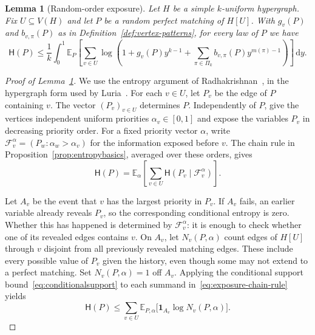 \documentclass[11pt,reqno]{amsart}
\numberwithin{equation}{section}
\theoremstyle{plain}
\newtheorem{lemma}[theorem]{Lemma}
\theoremstyle{definition}
\newcommand{\E}{\mathbb E}
\newcommand{\HH}{\mathsf H}
\newcommand{\dd}{\,\mathrm d}
\begin{document}
\begin{lemma}[Random-order exposure]\label{lem:random-order-entropy}
    Let $H$ be a simple $k$-uniform hypergraph. Fix $U\subseteq V(H)$ and let $P$ be a random perfect matching of $H[U]$.
    With $g_v(P)$ and $b_{v,\pi}(P)$ as in Definition~\ref{def:vertex-patterns}, for every law of $P$ we have
    \[
        \HH(P)\le\frac1k\int_0^1\E_P\left[\sum_{v\in U}
        \log\left(1+g_v(P)y^{k-1}+\sum_{\pi\in\Pi_k}b_{v,\pi}(P)y^{m(\pi)-1}\right)\right]\dd y.
    \]
\end{lemma}
\begin{proof}[Proof of Lemma~\ref{lem:random-order-entropy}]
    We use the entropy argument of Radhakrishnan~\cite{Radhakrishnan}, in the hypergraph form used by Luria~\cite[proof of Theorem~3.1]{Luria}.
    For each $v\in U$, let $P_v$ be the edge of $P$ containing $v$.
    The vector $(P_v)_{v\in U}$ determines $P$.
    Independently of $P$, give the vertices independent uniform priorities $\alpha_v\in[0,1]$ and expose the variables $P_v$ in decreasing priority order.
    For a fixed priority vector $\alpha$, write $\mathcal F_v^\alpha=(P_w:\alpha_w>\alpha_v)$ for the information exposed before $v$.
    The chain rule in Proposition~\ref{prop:entropybasics}, averaged over these orders, gives
    \begin{equation}\label{eq:exposure-chain-rule}
        \HH(P)=\E_\alpha\left[\sum_{v\in U}\HH(P_v\mid\mathcal F_v^\alpha)\right].
    \end{equation}

    Let $A_v$ be the event that $v$ has the largest priority in $P_v$.
    If $A_v$ fails, an earlier variable already reveals $P_v$, so the corresponding conditional entropy is zero.
    Whether this has happened is determined by $\mathcal F_v^\alpha$: it is enough to check whether one of its revealed edges contains $v$.
    On $A_v$, let $N_v(P,\alpha)$ count edges of $H[U]$ through $v$ disjoint from all previously revealed matching edges.
    These include every possible value of $P_v$ given the history, even though some may not extend to a perfect matching.
    Set $N_v(P,\alpha)=1$ off $A_v$.
    Applying the conditional support bound~\eqref{eq:conditionalsupport} to each summand in~\eqref{eq:exposure-chain-rule} yields
    \begin{equation}\label{eq:exposure-support-sum}
        \HH(P)\le\sum_{v\in U}\E_{P,\alpha}
        \bigl[\mathbf1_{A_v}\log N_v(P,\alpha)\bigr].
    \end{equation}


\end{proof}
\end{document}
